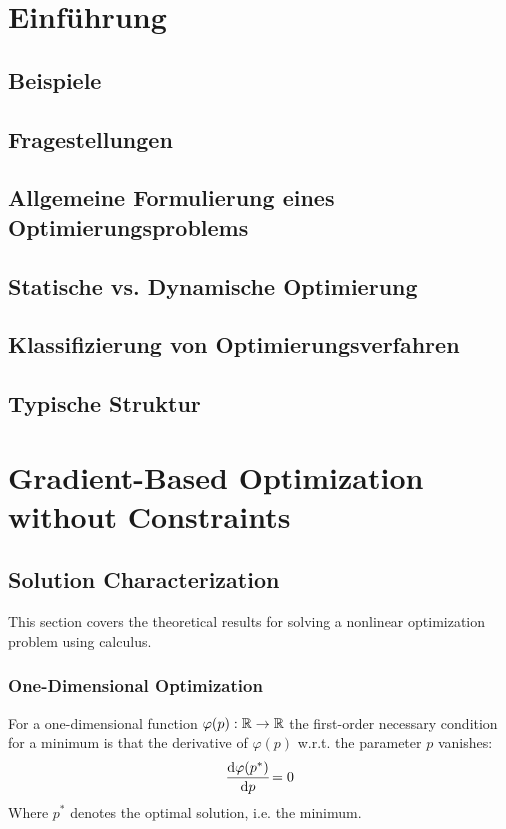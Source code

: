 
\chapter{Einführung} %

	\section{Beispiele} %

	\section{Fragestellungen} %

	\section{Allgemeine Formulierung eines Optimierungsproblems} %

	\section{Statische vs. Dynamische Optimierung} %

	\section{Klassifizierung von Optimierungsverfahren} %

	\section{Typische Struktur} %

\chapter{Gradient-Based Optimization without Constraints}
	\section{Solution Characterization}
		This section covers the theoretical results for solving a nonlinear optimization problem using calculus.
	
		\subsection{One-Dimensional Optimization}
			For a one-dimensional function \( \varphi(p) : \mathbb{R} \to \mathbb{R} \) the first-order necessary condition for a minimum is that the derivative of \( \varphi(p) \) w.r.t. the parameter \(p\) vanishes:
			\begin{align*}
				\dv{\varphi(p^\ast)}{p} \! = 0
			\end{align*}
			Where \( p^\ast \) denotes the optimal solution, i.e. the minimum.
			
